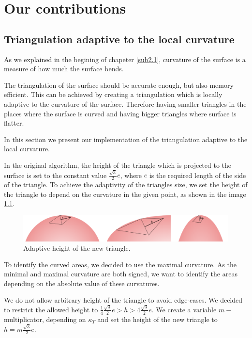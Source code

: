 \chapter{Our contributions}
\label{chap3}

\section{Triangulation adaptive to the local curvature}
\label{sub3.1}

As we explained in the begining of chapeter \ref{sub2.1}, curvature of the surface
is a measure of how much the surface bends.

The triangulation of the surface should be accurate enough, but also memory efficient.
This can be achieved by creating a triangulation which is locally adaptive to the
curvature of the surface. Therefore having smaller triangles in the places where
the surface is curved and having bigger triangles where surface is flatter.

In this section we present our implementation of the triangulation adaptive
to the local curvature.

In the original algorithm, the height of the triangle which is projected
to the surface is set to the constant value $\frac{\sqrt{3}}{2}e$, where $e$ 
is the required length of the side of the triangle. To achieve the adaptivity
of the triangles size, we set the height of the triangle to depend on the curvature in
the given point, as shown in the image \ref{img:15}.

\begin{figure}
    \centerline{\includegraphics[width=1\textwidth]{images/img15}}
    \caption[Adaptive height of the new triangle]
    {Adaptive height of the new triangle.}
    \label{img:15}
\end{figure}

To identify the curved areas, we decided to use the maximal curvature. As the minimal
and maximal curvature are both signed, we want to identify the areas depending on 
the absolute value of these curvatures.

We do not allow arbitrary height of the triangle to avoid edge-cases. We decided
to restrict the allowed height to $\frac{1}{4}\frac{\sqrt{3}}{2}e>h>4\frac{\sqrt{3}}{2}e$.
We create a variable $m-$multiplicator, depending on $\kappa_T$ and set the height of
the new triangle to $h=m\frac{\sqrt{3}}{2}e$.

